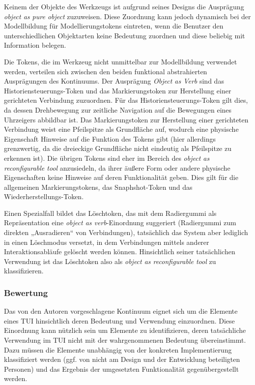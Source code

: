 Keinem der Objekte des Werkzeugs ist aufgrund seines Designs die Ausprägung \emph{object as pure object} zuzuweisen. Diese Zuordnung kann jedoch dynamisch bei der Modellbildung für Modellierungstokens eintreten, wenn die Benutzer den unterschiedlichen Objektarten keine Bedeutung zuordnen und diese beliebig mit Information belegen. 

Die Tokens, die im Werkzeug nicht unmittelbar zur Modellbildung verwendet werden, verteilen sich zwischen den beiden funktional abstrahierten Ausprägungen des Kontinuums. Der Ausprägung \emph{Object as Verb} sind das Historiensteuerungs-Token und das Markierungstoken zur Herstellung einer gerichteten Verbindung zuzuordnen. Für das Historiensteuerungs-Token gilt dies, da dessen Drehbewegung zur zeitliche Navigation auf die Bewegungen eines Uhrzeigers abbildbar ist. Das Markierungstoken zur Herstellung einer gerichteten Verbindung weist eine Pfeilspitze als Grundfläche auf, wodurch eine physische Eigenschaft Hinweise auf die Funktion des Tokens gibt (hier allerdings grenzwertig, da die dreieckige Grundfläche nicht eindeutig als Pfeilspitze zu erkennen ist). Die übrigen Tokens sind eher im Bereich des \emph{object as reconfigurable tool} anzusiedeln, da ihrer äußere Form oder andere physische Eigenschaften keine Hinweise auf deren Funktionalität geben. Dies gilt für die allgemeinen Markierungstokens, das Snaphshot-Token und das Wieder\-herstellungs-Token. 

Einen Spezialfall bildet das Löschtoken, das mit dem Radiergummi als Repräsentation eine \emph{object as verb}-Einordnung suggeriert (Radiergummi zum direkten „Ausradieren“ von Verbindungen), tatsächlich das System aber lediglich in einen Löschmodus versetzt, in dem Verbindungen mittels anderer Interaktionsabläufe gelöscht werden können. Hinsichtlich seiner tatsächlichen Verwendung ist das Löschtoken also als \emph{object as reconfigurable tool} zu klassifizieren.

\subsubsection{Bewertung} 

Das von den Autoren vorgeschlagene Kontinuum eignet sich um die Elemente eines \gls{TUI} hinsichtlich deren Bedeutung und Verwendung einzuordnen. Diese Einordnung kann nützlich sein um Elemente zu identifizieren, deren tatsächliche Verwendung im TUI nicht mit der wahrgenommenen Bedeutung übereinstimmt. Dazu müssen die Elemente unabhängig von der konkreten Implementierung klassifiziert werden (ggf. von nicht am Design und der Entwicklung beteiligten Personen) und das Ergebnis der umgesetzten Funktionalität gegenübergestellt werden.

